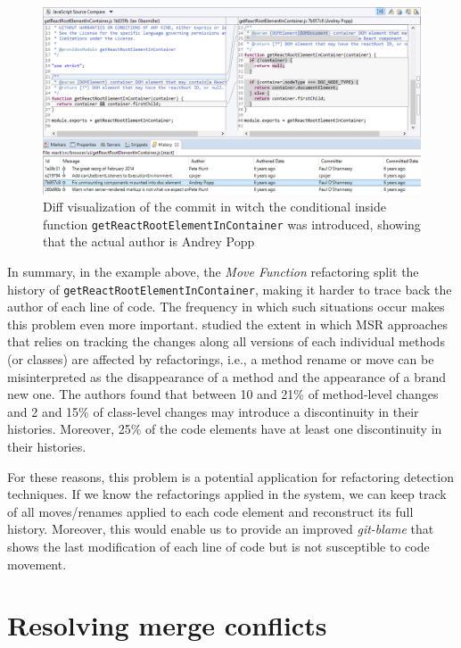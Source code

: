 \begin{figure}[htbp]
\centering
\includegraphics[width=\linewidth]{img/git-blame-react-actual-author.png}
\caption{Diff visualization of the commit in witch the conditional inside function \texttt{getReactRootElementInContainer} was introduced, showing that the actual author is Andrey Popp}
\label{FigGitBlameReactActualAuthor}
\end{figure}

In summary, in the example above, the \textit{Move Function} refactoring split the history of \texttt{getReactRootElementInContainer}, making it harder to trace back the author of each line of code.
The frequency in which such situations occur makes this problem even more important. \cite{icse2018} studied the extent in which MSR approaches that relies on tracking
the changes along all versions of each individual methods (or classes) are affected by refactorings, i.e., a method rename or move can be misinterpreted as the disappearance of a method and the appearance of a brand new one.
The authors found that between 10 and 21\% of method-level changes and 2 and 15\% of class-level changes may introduce a discontinuity in their histories.
Moreover, 25\% of the code elements have at least one discontinuity in their histories.

For these reasons, this problem is a potential application for refactoring detection techniques. If we know the refactorings applied in the system, we can keep track of all moves/renames applied to each code element and reconstruct its full history.
Moreover, this would enable us to provide an improved \textit{git-blame} that shows the last modification of each line of code but is not susceptible to code movement.



\section{Resolving merge conflicts}
\label{SecAppMerge}

